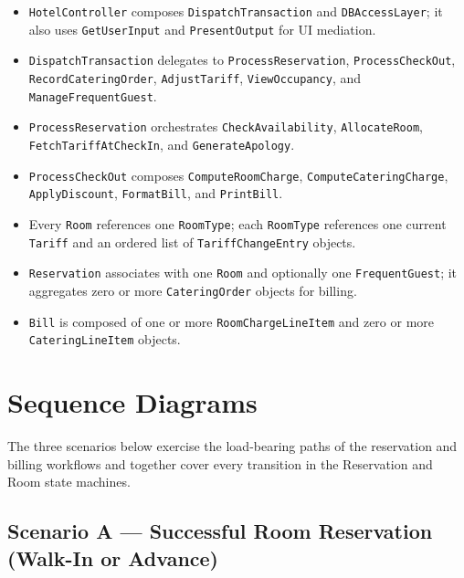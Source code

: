 \documentclass[12pt,a4paper]{article}
\begin{document}
\begin{itemize}[leftmargin=1.5em]
  \item \texttt{HotelController} composes \texttt{DispatchTransaction} and
        \texttt{DBAccessLayer}; it also uses \texttt{GetUserInput} and
        \texttt{PresentOutput} for UI mediation.
  \item \texttt{DispatchTransaction} delegates to \texttt{ProcessReservation},
        \texttt{ProcessCheckOut}, \texttt{RecordCateringOrder}, \texttt{AdjustTariff},
        \texttt{ViewOccupancy}, and \texttt{ManageFrequentGuest}.
  \item \texttt{ProcessReservation} orchestrates \texttt{CheckAvailability},
        \texttt{AllocateRoom}, \texttt{FetchTariffAtCheckIn}, and
        \texttt{GenerateApology}.
  \item \texttt{ProcessCheckOut} composes \texttt{ComputeRoomCharge},
        \texttt{ComputeCateringCharge}, \texttt{ApplyDiscount}, \texttt{FormatBill},
        and \texttt{PrintBill}.
  \item Every \texttt{Room} references one \texttt{RoomType}; each \texttt{RoomType}
        references one current \texttt{Tariff} and an ordered list of
        \texttt{TariffChangeEntry} objects.
  \item \texttt{Reservation} associates with one \texttt{Room} and optionally one
        \texttt{FrequentGuest}; it aggregates zero or more \texttt{CateringOrder}
        objects for billing.
  \item \texttt{Bill} is composed of one or more \texttt{RoomChargeLineItem} and
        zero or more \texttt{CateringLineItem} objects.
\end{itemize}

\newpage

\section{Sequence Diagrams}

The three scenarios below exercise the load-bearing paths of the reservation and
billing workflows and together cover every transition in the Reservation and Room
state machines.

\subsection{Scenario A --- Successful Room Reservation (Walk-In or Advance)}
\end{document}
